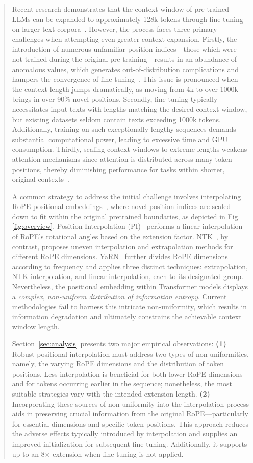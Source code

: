 \begin{abstract}
Recent research demonstrates that the context window of pre-trained LLMs can be expanded to approximately 128k tokens through fine-tuning on larger text corpora~\cite{longlora,pi,yarn,zhang2024soaring,liu2023scaling}. However, the process faces three primary challenges when attempting even greater context expansion. Firstly, the introduction of numerous unfamiliar position indices—those which were not trained during the original pre-training—results in an abundance of anomalous values, which generates out-of-distribution complications and hampers the convergence of fine-tuning~\cite{pi}. This issue is pronounced when the context length jumps dramatically, as moving from 4k to over 1000k brings in over 90\% novel positions. Secondly, fine-tuning typically necessitates input texts with lengths matching the desired context window, but existing datasets seldom contain texts exceeding 1000k tokens. Additionally, training on such exceptionally lengthy sequences demands substantial computational power, leading to excessive time and GPU consumption. Thirdly, scaling context windows to extreme lengths weakens attention mechanisms since attention is distributed across many token positions, thereby diminishing performance for tasks within shorter, original contexts~\cite{pi}.

A common strategy to address the initial challenge involves interpolating RoPE positional embeddings~\cite{rope,pi}, where novel position indices are scaled down to fit within the original pretrained boundaries, as depicted in Fig.\ref{fig:overview}. Position Interpolation (PI)~\cite{pi} performs a linear interpolation of RoPE's rotational angles based on the extension factor. NTK~\cite{ntk,dynamicntk}, by contrast, proposes uneven interpolation and extrapolation methods for different RoPE dimensions. YaRN~\cite{yarn} further divides RoPE dimensions according to frequency and applies three distinct techniques: extrapolation, NTK interpolation, and linear interpolation, each to its designated group. Nevertheless, the positional embedding within Transformer models displays a \emph{complex, non-uniform distribution of information entropy}. Current methodologies fail to harness this intricate non-uniformity, which results in information degradation and ultimately constrains the achievable context window length.

Section~\ref{sec:analysis} presents two major empirical observations: \textbf{(1)} Robust positional interpolation must address two types of non-uniformities, namely, the varying RoPE dimensions and the distribution of token positions. Less interpolation is beneficial for both lower RoPE dimensions and for tokens occurring earlier in the sequence; nonetheless, the most suitable strategies vary with the intended extension length. \textbf{(2)} Incorporating these sources of non-uniformity into the interpolation process aids in preserving crucial information from the original RoPE—particularly for essential dimensions and specific token positions. This approach reduces the adverse effects typically introduced by interpolation and supplies an improved initialization for subsequent fine-tuning. Additionally, it supports up to an 8$\times$ extension when fine-tuning is not applied.


\end{abstract}
